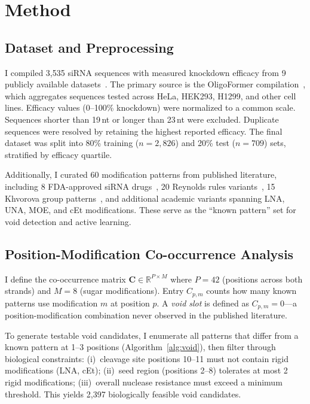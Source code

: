 \documentclass{article}
\begin{document}

\section{Method}

\subsection{Dataset and Preprocessing}

I compiled 3,535 siRNA sequences with measured knockdown efficacy from 9 publicly available datasets~\citep{huesken2005, takahashi2009, dar2016}. The primary source is the OligoFormer compilation~\citep{oligoformer2024}, which aggregates sequences tested across HeLa, HEK293, H1299, and other cell lines. Efficacy values (0--100\% knockdown) were normalized to a common scale. Sequences shorter than 19\,nt or longer than 23\,nt were excluded. Duplicate sequences were resolved by retaining the highest reported efficacy. The final dataset was split into 80\% training ($n=2{,}826$) and 20\% test ($n=709$) sets, stratified by efficacy quartile.

Additionally, I curated 60 modification patterns from published literature, including 8 FDA-approved siRNA drugs~\citep{foster2018, setten2019}, 20 Reynolds rules variants~\citep{reynolds2004}, 15 Khvorova group patterns~\citep{khvorova2003}, and additional academic variants spanning LNA, UNA, MOE, and cEt modifications. These serve as the ``known pattern'' set for void detection and active learning.

\subsection{Position-Modification Co-occurrence Analysis}

I define the co-occurrence matrix $\mathbf{C} \in \mathbb{R}^{P \times M}$ where $P=42$ (positions across both strands) and $M=8$ (sugar modifications). Entry $C_{p,m}$ counts how many known patterns use modification $m$ at position $p$. A \emph{void slot} is defined as $C_{p,m} = 0$---a position-modification combination never observed in the published literature.

To generate testable void candidates, I enumerate all patterns that differ from a known pattern at 1--3 positions (Algorithm~\ref{alg:void}), then filter through biological constraints: (i)~cleavage site positions 10--11 must not contain rigid modifications (LNA, cEt); (ii)~seed region (positions 2--8) tolerates at most 2 rigid modifications; (iii)~overall nuclease resistance must exceed a minimum threshold. This yields 2,397 biologically feasible void candidates.
\end{document}
